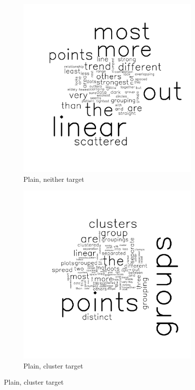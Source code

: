 \documentclass[11pt]{isuthesis}\usepackage[]{graphicx}\usepackage[]{color}
\begin{document}
\begin{figure}[ht]\centering


\centering
\begin{subfigure}[t]{0.32\linewidth}\centering
  \caption{Plain, neither target}
  \includegraphics[width=.83\linewidth]{fig-sentiment-1}
\end{subfigure}
\begin{subfigure}[t]{0.32\linewidth}\centering
  \caption{Plain, cluster target}
  \includegraphics[width=.83\linewidth]{fig-sentiment-2}
\end{subfigure}

\end{figure}
\end{document}
